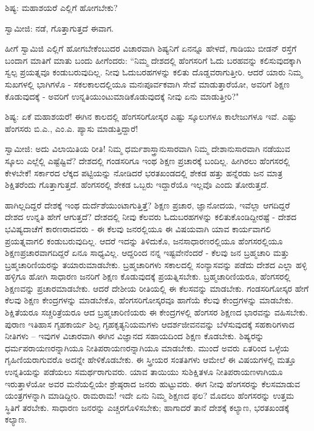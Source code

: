 ಶಿಷ್ಯ: ಮಹಾಶಯರೆ ಎಲ್ಲಿಗೆ ಹೋಗಬೇಕು?

ಸ್ವಾಮೀಜಿ: ನಡೆ, ಗೊತ್ತಾಗುತ್ತದೆ ಈವಾಗ.

ಹೀಗೆ ಸ್ವಾಮಿಜಿ ಎಲ್ಲಿಗೆ ಹೋಗಬೇಕೆಂಬುದರ ವಿಚಾರವಾಗಿ ಶಿಷ್ಯನಿಗೆ ಏನನ್ನೂ ಹೇಳದೆ, ಗಾಡಿಯು ಬೀಡನ್ ರಸ್ತೆಗೆ ಬಂದಾಗ ಮಾತಿಗೆ ಮಾತು ಬಂದು ಹೀಗೆಂದರು: “ನಿಮ್ಮ ದೇಶದಲ್ಲಿ ಹೆಂಗಸರಿಗೆ ಓದು ಬರಹವನ್ನು ಕಲಿಸುವುದಕ್ಕಾಗಿ ಸ್ವಲ್ಪ ಪ್ರಯತ್ನವೂ ಕಂಡುಬರುವುದಿಲ್ಲ. ನೀವು ಓದುಬರಹಗಳನ್ನು ಕಲಿತು ದೊಡ್ಡವರಾಗುತ್ತೀರಿ. ಆದರೆ ಯಾರು ನಿಮ್ಮ ಸುಖಗಳಲ್ಲಿ ಭಾಗಿಗಳೊ - ಸಕಲಕಾಲದಲ್ಲಿಯೂ ಮನಃಪೂರ್ವಕವಾಗಿ ಸೇವೆ ಮಾಡುತ್ತಾರೆಯೋ, ಅವರಿಗೆ ಶಿಕ್ಷಣ ಕೊಡುವುದಕ್ಕೆ - ಅವರಿಗೆ ಉನ್ನತಿಯುಂಟುಮಾಡಿಕೊಡುವುದಕ್ಕೆ ನೀವು ಏನು ಮಾಡುತ್ತೀರಿ?"

ಶಿಷ್ಯ: ಏಕೆ ಮಹಾಶಯರೆ! ಈಗಿನ ಕಾಲದಲ್ಲಿ ಹೆಂಗಸರಿಗೋಸ್ಕರ ಎಷ್ಟು ಸ್ಕೂಲುಗಳೂ ಕಾಲೇಜುಗಳೂ ಇವೆ. ಎಷ್ಟು ಹೆಂಗಸರು ಬಿ.ಎ., ಎಂ.ಎ. ಪ್ಯಾಸು ಮಾಡುತ್ತಿದ್ದಾರೆ!

ಸ್ವಾಮೀಜಿ: ಅದು ವಿಲಾಯಿತಿಯ ರೀತಿ! ನಿಮ್ಮ ಧರ್ಮಶಾಸ್ತ್ರಾನುಸಾರವಾಗಿ ನಿಮ್ಮ ದೇಶಾನುಸಾರವಾಗಿ ನಡೆಯುವ ಸ್ಕೂಲು ಎಲ್ಲೆಲ್ಲಿ ಎಷ್ಟೆಷ್ಟಿವೆ? ದೇಶದಲ್ಲಿ ಗಂಡಸರಿಗೂ ಇಂಥ ಶಿಕ್ಷಣ ಪ್ರಚಾರಕ್ಕೆ ಬಂದಿಲ್ಲ. ಹೀಗಿರಲು ಹೆಂಗಸರಲ್ಲಿ ಕೇಳಬೇಕೆ! ಸರ್ಕಾರದ ಲೆಕ್ಕದ ಪಟ್ಟಿಯನ್ನು ನೋಡಿದರೆ ಭರತಖಂಡದಲ್ಲಿ ಶೇಕಡ ಹತ್ತು ಹನ್ನೆರಡು ಜನ ಮಾತ್ರ ಶಿಕ್ಷಿತರೆಂದು ಗೊತ್ತಾಗುತ್ತದೆ. ಹೆಂಗಸರಲ್ಲಿ ಶೇಕಡ ಒಬ್ಬರು ಇದ್ದಾರೆಯೊ ಇಲ್ಲವೊ ಎಂದು ತೋರುತ್ತದೆ.

ಹಾಗಿಲ್ಲದಿದ್ದರೆ ದೇಶಕ್ಕೆ ಇಂಥ ದುರ್ದೆಶೆಯುಂಟಾಗುತ್ತಿತ್ತೆ? ಶಿಕ್ಷಣ ಪ್ರಚಾರ, ಜ್ಞಾನೋದಯ, ಇವೆಲ್ಲಾ ಆಗದಿದ್ದರೆ ದೇಶದ ಉನ್ನತಿ ಹೇಗೆ ಆಗುತ್ತದೆ? ದೇಶದಲ್ಲಿ ನೀವು ಕೆಲವರು ಓದುಬರಹಗಳನ್ನು ಕಲಿತುಕೊಂಡಿದ್ದೀರಷ್ಟೆ - ದೇಶದ ಭವಿಷ್ಯದಾಚೆಗೆ ಕಾರಣರಾದವರು - ಈ ಕೆಲವು ಜನರಲ್ಲಿಯೂ ಈ ವಿಷಯವಾಗಿ ಯಾವ ಕಾರ್ಯವಾಗಲಿ ಪ್ರಯತ್ನವಾಗಲಿ ಕಂಡುಬರುವುದಿಲ್ಲ. ಆದರೆ ಇದನ್ನು ತಿಳಿದುಕೊ, ಜನಸಾಧಾರಣರಲ್ಲಿಯೂ ಹೆಂಗಸರಲ್ಲಿಯೂ ಶಿಕ್ಷಣಪ್ರಚಾರವಾಗದಿದ್ದರೆ ಏನೂ ಸಾಧ್ಯವಿಲ್ಲ. ಆದ್ದರಿಂದ ನನ್ನ ಇಷ್ಟವೇನೆಂದರೆ - ಕೆಲವು ಜನ ಬ್ರಹ್ಮಚಾರಿ ಮತ್ತು ಬ್ರಹ್ಮಚಾರಿಣಿಯರನ್ನು ತಯಾರುಮಾಡಬೇಕು. ಬ್ರಹ್ಮಚಾರಿಗಳು ಸಕಾಲದಲ್ಲಿ ಸಂನ್ಯಾಸವನ್ನು ಪಡೆದು ದೇಶದ ಎಲ್ಲಾ ಹಳ್ಳಿ ಹಳ್ಳಿಗೂ ಹೋಗಿ ಸಾಧಾರಣ ಜನರಿಗೆ ಶಿಕ್ಷಣ ಕೊಡುವುದಕ್ಕೆ ಪ್ರಯತ್ನಿಸಬೇಕು. ಬ್ರಹ್ಮಚಾರಿಣಿಯರೂ, ಹೆಂಗಸರಲ್ಲಿ ಶಿಕ್ಷಣವನ್ನು ಪ್ರಚಾರಮಾಡಬೇಕು. ಆದರೆ ದೇಶೀಯ ರೀತಿಯಲ್ಲಿ ಈ ಕೆಲಸವನ್ನು ಮಾಡಬೇಕು. ಗಂಡಸರಿಗೋಸ್ಕರ ಹೇಗೆ ಕೆಲವು ಶಿಕ್ಷಣ ಕೇಂದ್ರಗಳನ್ನು ಮಾಡಬೇಕೊ, ಹೆಂಗಸರಿಗೋಸ್ಕರವೂ ಹಾಗೆಯೆ ಕೆಲವು ಕೇಂದ್ರಗಳನ್ನು ಮಾಡಬೇಕು. ಶಿಕ್ಷಿತೆಯರೂ ಸಚ್ಚರಿತ್ರೆಯರೂ ಆದ ಬ್ರಹ್ಮಚಾರಿಣಿಯರು ಈ ಕೇಂದ್ರಗಳಲ್ಲಿ ಹೆಂಗಸರ ಶಿಕ್ಷಣದ ಭಾರವನ್ನು ವಹಿಸಬೇಕು. ಪುರಾಣ ಇತಿಹಾಸ ಗೃಹಕಾರ್ಯ ಶಿಲ್ಪ ಗೃಹಕೃತ್ಯನಿಯಮಗಳು ಆದರ್ಶಜೀವನವನ್ನು ಬೆಳೆಸುವುದಕ್ಕೆ ಸಹಕಾರಿಗಳಾದ ನೀತಿಗಳು – ಇವುಗಳ ವಿಚಾರವಾಗಿ ಈಗಿನ ವಿಜ್ಞಾನದ ಸಹಾಯದಿಂದ ಶಿಕ್ಷಣ ಕೊಡಬೇಕು. ಶಿಷ್ಯರನ್ನು ಧರ್ಮಪರಾಯಣರನ್ನಾಗಿಯೂ ನೀತಿಪರಾಯಣರನ್ನಾಗಿಯೂ ಮಾಡಬೇಕು. ಮುಂದೆ ಅವರು ಏತರಿಂದ ಒಳ್ಳೆಯ ಗೃಹಿಣಿಯರಾಗುವರೊ ಅದನ್ನೇ ಹೇಳಿಕೊಡಬೇಕು. ಈ ಸ್ತ್ರೀಯರ ಸಂತತಿಗಳು ಆಮೇಲೆ ಈ ವಿಷಯಗಳಲ್ಲಿ ಮತ್ತೂ ಉನ್ನತಿಯನ್ನು ಪಡೆಯಲು ಸಮರ್ಥರಾಗುವರು. ಯಾವ ತಾಯಿಯು ಸುಶಿಕ್ಷಿತಳೂ ನೀತಿಪರಾಯಣಳಾಗಿಯೂ ಇರುತ್ತಾಳೆಯೋ ಅವರ ಮನೆಯಲ್ಲಿಯೇ ಶ್ರೇಷ್ಠರಾದ ಜನರು ಹುಟ್ಟುವರು. ಈಗ ನೀವು ಹೆಂಗಸರನ್ನು ಕೆಲಸಮಾಡುವ ಯಂತ್ರಗಳನ್ನಾಗಿ ಮಾಡಿದ್ದೀರಿ. ರಾಮರಾಮ! ಇದೇ ಏನು ನಿಮ್ಮ ಶಿಕ್ಷಣದ ಫಲ? ಮೊದಲು ಹೆಂಗಸರನ್ನು ಉತ್ತಮ ಸ್ಥಿತಿಗೆ ತರಬೇಕು. ಸಾಧಾರಣ ಜನರನ್ನು ಎಚ್ಚರಗೊಳಿಸಬೇಕು; ಹಾಗಾದರೆ ತಾನೆ ದೇಶಕ್ಕೆ ಕಲ್ಯಾಣ, ಭರತಖಂಡಕ್ಕೆ ಕಲ್ಯಾಣ.

